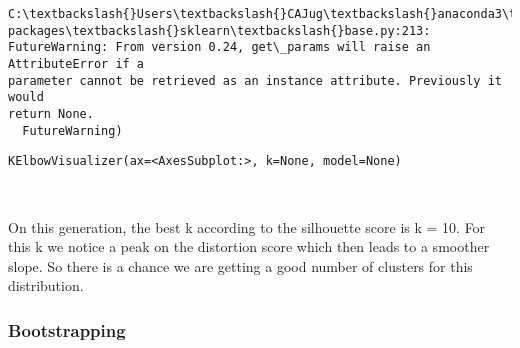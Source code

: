\documentclass[11pt]{article}
\makeatletter
\newcommand{\boxspacing}{\kern\kvtcb@left@rule\kern\kvtcb@boxsep}
\newcommand{\prompt}[4]{
        {\ttfamily\llap{{\color{#2}[#3]:\hspace{3pt}#4}}\vspace{-\baselineskip}}
    }
\makeatother
\begin{document}
    \begin{Verbatim}[commandchars=\\\{\}]
C:\textbackslash{}Users\textbackslash{}CAJug\textbackslash{}anaconda3\textbackslash{}envs\textbackslash{}R\_py37\textbackslash{}lib\textbackslash{}site-packages\textbackslash{}sklearn\textbackslash{}base.py:213:
FutureWarning: From version 0.24, get\_params will raise an AttributeError if a
parameter cannot be retrieved as an instance attribute. Previously it would
return None.
  FutureWarning)
    \end{Verbatim}

            \begin{tcolorbox}[breakable, size=fbox, boxrule=.5pt, pad at break*=1mm, opacityfill=0]
\prompt{Out}{outcolor}{18}{\boxspacing}
\begin{Verbatim}[commandchars=\\\{\}]
KElbowVisualizer(ax=<AxesSubplot:>, k=None, model=None)
\end{Verbatim}
\end{tcolorbox}
        
    \begin{center}
    \end{center}
    { \hspace*{\fill} \\}
    
    On this generation, the best k according to the silhouette score is k =
10. For this k we notice a peak on the distortion score which then leads
to a smoother slope. So there is a chance we are getting a good number
of clusters for this distribution.

    \hypertarget{bootstrapping}{%
\subsubsection{Bootstrapping}\label{bootstrapping}}
\end{document}

